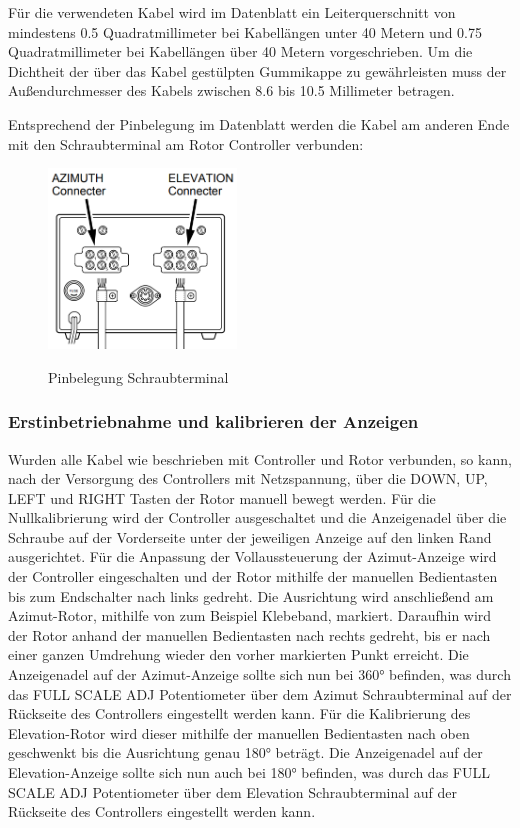 Für die verwendeten Kabel wird im Datenblatt ein Leiterquerschnitt von mindestens 0.5 Quadratmillimeter bei Kabellängen unter 40 Metern und 0.75 Quadratmillimeter bei Kabellängen über 40 Metern vorgeschrieben. Um die Dichtheit der über das Kabel gestülpten Gummikappe zu gewährleisten muss der Außendurchmesser des Kabels zwischen 8.6 bis 10.5 Millimeter betragen.
 
Entsprechend der Pinbelegung im Datenblatt werden die Kabel am anderen Ende mit den Schraubterminal am Rotor Controller verbunden:
\begin{figure}[H]
	\cite{noauthor_yaesu_nodate}
	\centering
	\includegraphics[width=5cm]{../ref/RotorInstallationScrewTerminal.png}
	\label{fig:Rotor_Schraubterminal}
	\caption{Pinbelegung Schraubterminal}
\end{figure}

\subsubsection{Erstinbetriebnahme und kalibrieren der Anzeigen}
Wurden alle Kabel wie beschrieben mit Controller und Rotor verbunden, so kann, nach der Versorgung des Controllers mit Netzspannung, über die DOWN, UP, LEFT und RIGHT Tasten der Rotor manuell bewegt werden. 
\newline
Für die  Nullkalibrierung wird der Controller ausgeschaltet und die Anzeigenadel über die Schraube auf der Vorderseite unter der jeweiligen Anzeige auf den linken Rand ausgerichtet. Für die Anpassung der Vollaussteuerung der Azimut-Anzeige wird der Controller eingeschalten und der Rotor mithilfe der manuellen Bedientasten bis zum Endschalter nach links gedreht. Die Ausrichtung wird anschließend am Azimut-Rotor, mithilfe von zum Beispiel Klebeband, markiert. Daraufhin wird der Rotor anhand der manuellen Bedientasten nach rechts gedreht, bis er nach einer ganzen Umdrehung wieder den vorher markierten Punkt erreicht. Die Anzeigenadel auf der Azimut-Anzeige sollte sich nun bei 360° befinden, was durch das FULL SCALE ADJ Potentiometer über dem Azimut Schraubterminal auf der Rückseite des Controllers eingestellt werden kann. Für die Kalibrierung des Elevation-Rotor wird dieser mithilfe der manuellen Bedientasten nach oben geschwenkt bis die Ausrichtung genau 180° beträgt. Die Anzeigenadel auf der Elevation-Anzeige sollte sich nun auch bei 180° befinden, was durch das FULL SCALE ADJ Potentiometer über dem Elevation Schraubterminal auf der Rückseite des Controllers eingestellt werden kann.


